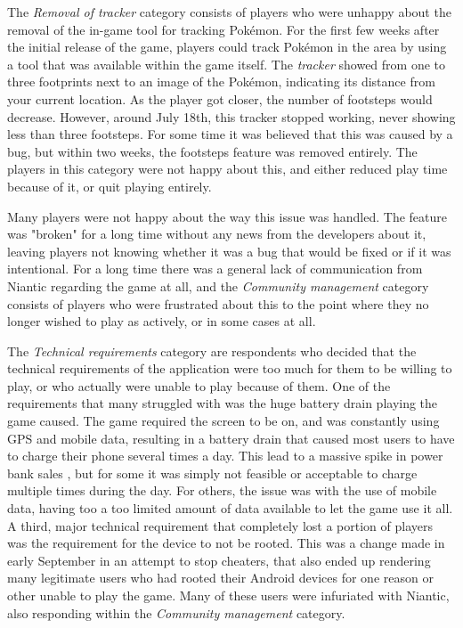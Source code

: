 The \emph{Removal of tracker} category consists of players who were unhappy about the removal of the in-game tool for tracking Pokémon. For the first few weeks after the initial release of the game, players could track Pokémon in the area by using a tool that was available within the game itself. The \emph{tracker} showed from one to three footprints next to an image of the Pokémon, indicating its distance from your current location. As the player got closer, the number of footsteps would decrease. However, around July 18th, this tracker stopped working, never showing less than three footsteps. For some time it was believed that this was caused by a bug, but within two weeks, the footsteps feature was removed entirely. The players in this category were not happy about this, and either reduced play time because of it, or quit playing entirely.

Many players were not happy about the way this issue was handled. The feature was "broken" for a long time without any news from the developers about it, leaving players not knowing whether it was a bug that would be fixed or if it was intentional. For a long time there was a general lack of communication from Niantic regarding the game at all, and the \emph{Community management} category consists of players who were frustrated about this to the point where they no longer wished to play as actively, or in some cases at all.

The \emph{Technical requirements} category are respondents who decided that the technical requirements of the application were too much for them to be willing to play, or who actually were unable to play because of them. One of the requirements that many struggled with was the huge battery drain playing the game caused. The game required the screen to be on, and was constantly using GPS and mobile data, resulting in a battery drain that caused most users to have to charge their phone several times a day. This lead to a massive spike in power bank sales , but for some it was simply not feasible or acceptable to charge multiple times during the day. For others, the issue was with the use of mobile data, having too a too limited amount of data available to let the game use it all. A third, major technical requirement that completely lost a portion of players was the requirement for the device to not be rooted. This was a change made in early September in an attempt to stop cheaters, that also ended up rendering many legitimate users who had rooted their Android devices for one reason or other unable to play the game. Many of these users were infuriated with Niantic, also responding within the \emph{Community management} category.

